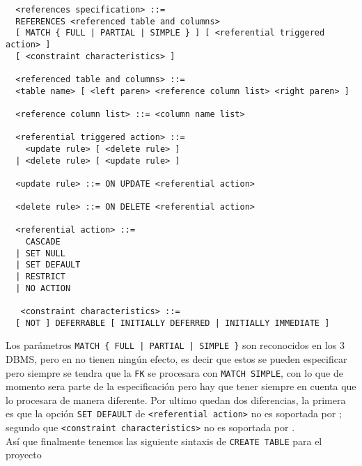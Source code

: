 \begin{Verbatim}
  <references specification> ::=
  REFERENCES <referenced table and columns>
  [ MATCH { FULL | PARTIAL | SIMPLE } ] [ <referential triggered action> ]
  [ <constraint characteristics> ]

  <referenced table and columns> ::=
  <table name> [ <left paren> <reference column list> <right paren> ]

  <reference column list> ::= <column name list>

  <referential triggered action> ::=
    <update rule> [ <delete rule> ]
  | <delete rule> [ <update rule> ]

  <update rule> ::= ON UPDATE <referential action>

  <delete rule> ::= ON DELETE <referential action>

  <referential action> ::=
    CASCADE
  | SET NULL
  | SET DEFAULT
  | RESTRICT
  | NO ACTION

   <constraint characteristics> ::=
  [ NOT ] DEFERRABLE [ INITIALLY DEFERRED | INITIALLY IMMEDIATE ]
\end{Verbatim}
Los parámetros \verb=MATCH { FULL | PARTIAL | SIMPLE }= son reconocidos en los 3 DBMS, pero en \s no tienen ningún efecto, es decir que estos se pueden especificar pero siempre se tendra que la \verb=FK= se procesara con \verb=MATCH SIMPLE=, con lo que de momento sera parte de la especificación pero hay que tener siempre en cuenta que \s lo procesara de manera diferente. Por ultimo quedan dos diferencias, la primera es que la opción \verb=SET DEFAULT= de \verb=<referential action>= no es soportada por \m; segundo que \verb=<constraint characteristics>= no es soportada por \m.\\




Así que finalmente tenemos las siguiente sintaxis de \verb=CREATE TABLE= para el proyecto\\

